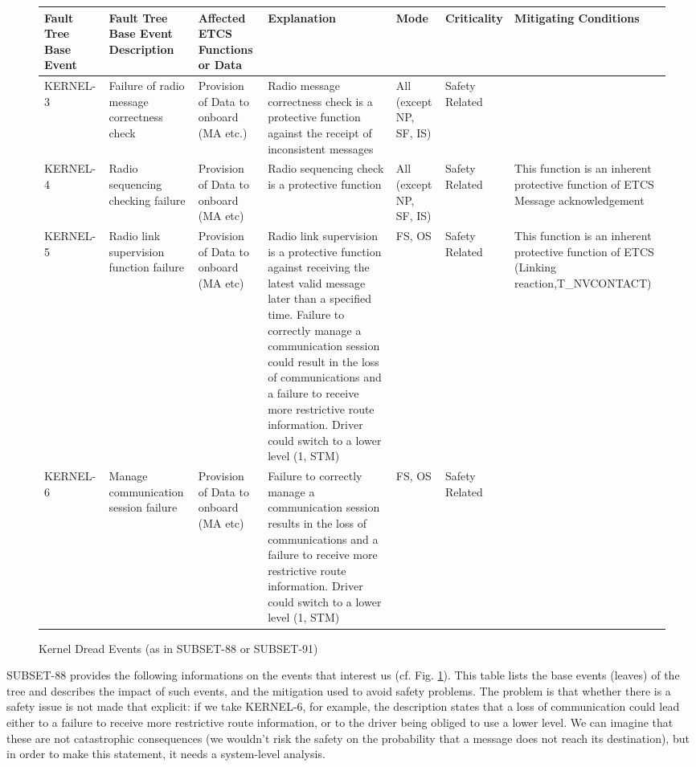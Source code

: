 \documentclass{template/openetcs_article}
\begin{document}
\begin{figure}
\begin{sideways}
{\small
\begin{tabular}{|p{1.7cm}|p{2cm}|p{2cm}|p{5cm}|p{1cm}|p{2cm}|p{2cm}|}
\hline
Fault Tree Base Event & Fault Tree Base Event Description & Affected ETCS Functions or Data &
Explanation & Mode & Criticality & Mitigating Conditions \\
\hline
KERNEL-3 & Failure of radio message correctness check & Provision of Data to onboard (MA etc.) &
Radio message correctness check is a protective function against the receipt of inconsistent messages &
All (except NP, SF, IS) & Safety Related & \\
\hline
KERNEL-4 & Radio sequencing checking failure & Provision of Data to onboard (MA etc) &
Radio sequencing check is a protective function & All (except NP, SF, IS) & Safety Related & 
This function is an inherent protective function of ETCS Message acknowledgement \\
\hline
KERNEL-5 & Radio link supervision function failure &  Provision of Data to
onboard (MA etc) & Radio link supervision is a protective function against
receiving the latest valid message later than a specified time.
Failure to correctly manage a communication session could result in the loss of
communications and a failure to receive more restrictive route information.
Driver could switch to a lower level (1, STM) & FS, OS & Safety Related & 
This function is an inherent protective function of ETCS (Linking reaction,T\_NV\-CONTACT) \\
\hline
KERNEL-6 & Manage communication session failure & Provision of Data to onboard (MA etc) & 
Failure to correctly manage a communication session results in the loss of communications and a 
failure to receive more restrictive route information. Driver could switch to a lower 
level (1, STM)  & FS, OS & Safety Related & \\
\hline
\end{tabular}
}
\end{sideways}
\caption{Kernel Dread Events (as in SUBSET-88 or SUBSET-91)}
\label{tab:kernel_evt}
\end{figure}

SUBSET-88 provides the following informations on the events that interest us 
(cf. Fig. \ref{tab:kernel_evt}). This table lists the base events (leaves) of the tree
and describes the impact of such events, and the mitigation used to avoid safety problems.
The problem is that whether there is a safety issue is not made that explicit: if we take
KERNEL-6, for example, the description states that a loss of communication could lead either to a 
failure to receive more restrictive route information, or to the driver being obliged to use a lower 
level. We can imagine that these are not catastrophic consequences (we wouldn't risk the safety on 
the probability that a message does not reach its destination), but in order to make this statement,
it needs a system-level analysis. 
\end{document}
